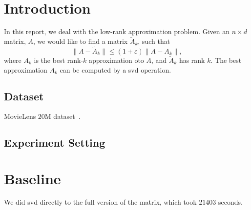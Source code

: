 \section{Introduction}
\label{sec:intro}

In this report, we deal with the low-rank approximation problem.
Given an $n\times d$ matrix, $A$,
we would like to find a matrix $\tilde{A}_k$,
such that
\begin{equation}
    \| A - \tilde{A}_k \| \le (1+\varepsilon) \| A - A_k \|,
\end{equation}
where $A_k$ is the best rank-$k$ approximation oto $A$,
and $\tilde{A}_k$ has rank $k$.
The best approximation $A_k$ can be computed by a svd operation.

\subsection{Dataset}

MovieLens 20M dataset~\cite{movielens}.

\subsection{Experiment Setting}

\section{Baseline}

We did svd directly to the full version of the matrix,
which took 21403 seconds.
